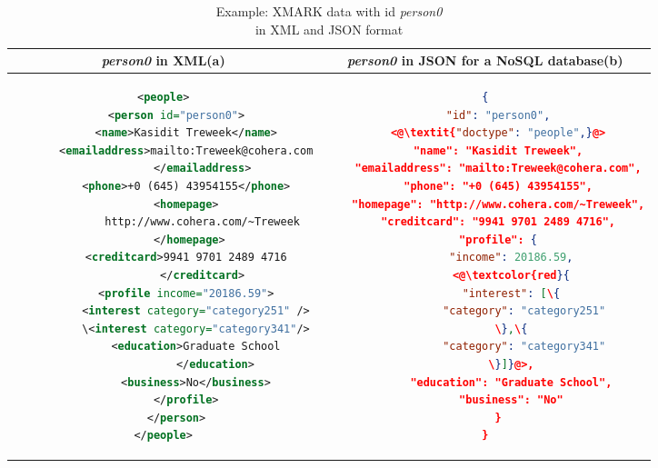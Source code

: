 \begin{longtable}{c|c}
	\caption{Example: XMARK data with id \textit{person0} \\in XML and JSON format }
	\label{tbl:xmark-xml-json}\\
	{\textit{person0}} in XML(a) & {\textit{person0}} in JSON for a NoSQL database(b)\\
	\hline
	\begin{minipage}{.4\textwidth}
\centering		
\begin{lstlisting}[language=XML,basicstyle = \tiny,label=code:xml-nosql-person0]
<people>
    <person id="person0">
       <name>Kasidit Treweek</name>
       <emailaddress>mailto:Treweek@cohera.com
            </emailaddress>
       <phone>+0 (645) 43954155</phone>
       <homepage>
            http://www.cohera.com/~Treweek
        </homepage>
       <creditcard>9941 9701 2489 4716
            </creditcard>
       <profile income="20186.59">
          <interest category="category251" />
          \<interest category="category341"/>
          <education>Graduate School
                </education>
          <business>No</business>
       </profile>
    </person>
</people>
\end{lstlisting}	
	\end{minipage} &
	\begin{minipage}{.55\textwidth}
		\centering
		\begin{lstlisting}[language=JSON, basicstyle =\tiny, label=code:json-nosql-person0, numberstyle=\tiny]
{
	"id": "person0",
	<@\textit{"doctype": "people",}@>
	"name": "Kasidit Treweek",
	"emailaddress": "mailto:Treweek@cohera.com",
	"phone": "+0 (645) 43954155",
	"homepage": "http://www.cohera.com/~Treweek",
	"creditcard": "9941 9701 2489 4716",
	"profile": {
		"income": 20186.59,
		<@\textcolor{red}{
		"interest": [\{
			"category": "category251"
		\},\{
			"category": "category341"
		\}]}@>,
		"education": "Graduate School",
		"business": "No"
	}
}
		\end{lstlisting}
	\end{minipage}\\
\end{longtable}



\begin{comment}
\iffalse\fi
\begin{minipage}{.5\textwidth}
	\begin{tikzpicture}[%
	grow via three points={one child at (0.5,-0.7) and
		two children at (0.5,-0.7) and (0.5,-1.4)},
	edge from parent path={(\tikzparentnode.south) |- (\tikzchildnode.west)}]
	\node {\{asfdasfd\}}
	child { node [defi] {\textit{Schema\_ID}}}
	child { node [json] {xs:attribute}
		child { node [defi] {\textit{Attribute\_ID}}}
		child { node [attribute] {@name}}
		child { node [attribute] {@type}}
		child { node [attribute] {@fixed}}
		child { node [attribute] {@default}}
	};
	\end{tikzpicture}
\end{minipage}

\end{comment}

